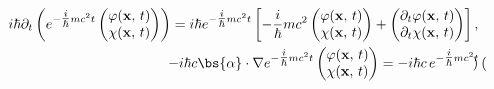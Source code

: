 \[
    \begin{aligned}
        i \hbar\partial_t \left(e^{-\tfrac{i}{\hbar} m c^2 t} \begin{pmatrix}
                                                                  \varphi(\mathbf{x},\,t) \\
                                                                  \chi(\mathbf{x},\,t)
                                                              \end{pmatrix}\right)                     = i \hbar e^{-\tfrac{i}{\hbar} m c^2 t} \left[-\frac{i}{\hbar} m c^2 \begin{pmatrix}
                                                                                                                                                                                    \varphi(\mathbf{x},\,t) \\
                                                                                                                                                                                    \chi(\mathbf{x},\,t)
                                                                                                                                                                                \end{pmatrix} + \begin{pmatrix}
                                                                                                                                                                                                    \partial_t \varphi(\mathbf{x},\,t) \\
                                                                                                                                                                                                    \partial_t \chi(\mathbf{x},\,t)
                                                                                                                                                                                                \end{pmatrix}\right], \\
        -i \hbar c \bs{\alpha} \cdot \nabla e^{-\tfrac{i}{\hbar} m c^2 t} \begin{pmatrix}
                                                                              \varphi(\mathbf{x},\,t) \\
                                                                              \chi(\mathbf{x},\,t)
                                                                          \end{pmatrix} = -i \hbar c\, e^{-\tfrac{i}{\hbar} m c^2 t} \begin{pmatrix}

\end{pmatrix}
\end{aligned}\]
